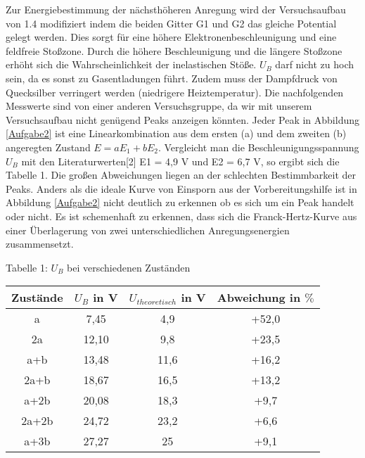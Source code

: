\documentclass[a4paper,10pt]{scrartcl}
\begin{document}
Zur Energiebestimmung der nächsthöheren Anregung wird der Versuchsaufbau von 1.4 modifiziert indem die beiden Gitter G1 und G2 das gleiche Potential gelegt werden. Dies sorgt für eine höhere Elektronenbeschleunigung und eine feldfreie Stoßzone.
Durch die höhere Beschleunigung und die längere Stoßzone erhöht sich die Wahrscheinlichkeit der inelastischen Stöße. $U_B$ darf nicht zu hoch sein, da es sonst zu Gasentladungen führt. \newline
Zudem muss der Dampfdruck von Quecksilber verringert werden (niedrigere Heiztemperatur).
\newline
Die nachfolgenden Messwerte sind von einer anderen Versuchsgruppe, da wir mit unserem Versuchsaufbau nicht genügend Peaks anzeigen könnten. 
\newline
Jeder Peak in Abbildung \ref{Aufgabe2} ist eine Linearkombination aus dem ersten (a) und dem zweiten (b) angeregten Zustand $E = a E_1 + b E_2$.
\newline
Vergleicht man die Beschleunigungsspannung $U_B$ mit den Literaturwerten[2] E1 = 4,9 V und E2 = 6,7 V, so ergibt sich die Tabelle 1.\newline \newline
Die großen Abweichungen liegen an der schlechten Bestimmbarkeit der Peaks. Anders als die ideale Kurve von Einsporn aus der Vorbereitungshilfe ist in Abbildung \ref{Aufgabe2} nicht deutlich zu erkennen ob es sich um ein Peak handelt oder nicht.
\newline Es ist schemenhaft zu erkennen, dass sich die Franck-Hertz-Kurve aus einer Überlagerung von zwei unterschiedlichen Anregungsenergien zusammensetzt.

\newpage
Tabelle 1: $U_B$ bei verschiedenen Zuständen
\begin{center}


\begin{tabular}{c ccc}
Zustände &$U_B$ in V & $U_{theoretisch}$ in V & Abweichung in $\%$  \\
\hline
  a & 7,45 & 4,9 & +52,0  \\
2a & 12,10 & 9,8 & +23,5 \\
a+b & 13,48 & 11,6 & +16,2  \\
2a+b & 18,67 & 16,5 & +13,2  \\
a+2b & 20,08 & 18,3 & +9,7  \\
2a+2b & 24,72 & 23,2 & +6,6 \\
a+3b & 27,27 & 25 & +9,1 \\

\end{tabular}
\end{center} 
\end{document}
